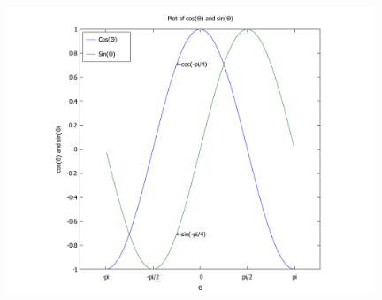\documentclass[a4paper,11pt]{article}
\begin{document}
\includegraphics[height=9cm, width=11cm]{sin(th).pdf}
\end{document}
